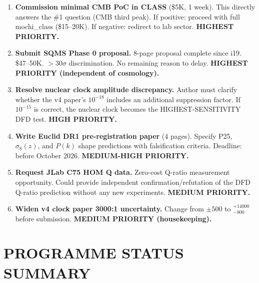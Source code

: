 \documentclass[11pt]{article}
\begin{document}
\begin{enumerate}[label=\textbf{A\arabic*.}]

\item \textbf{Commission minimal CMB PoC in CLASS} (\$5K, 1 week).
  This directly answers the \#1 question (CMB third peak).
  If positive: proceed with full mochi\_class (\$15--20K).
  If negative: redirect to lab sector.
  \textbf{HIGHEST PRIORITY.}

\item \textbf{Submit SQMS Phase 0 proposal.}
  8-page proposal complete since i19.  \$47--50K.  $>30\sigma$
  discrimination.  No remaining reason to delay.
  \textbf{HIGHEST PRIORITY (independent of cosmology).}

\item \textbf{Resolve nuclear clock amplitude discrepancy.}
  Author must clarify whether the v4 paper's $10^{-18}$ includes
  an additional suppression factor.  If $10^{-15}$ is correct,
  the nuclear clock becomes the HIGHEST-SENSITIVITY DFD test.
  \textbf{HIGH PRIORITY.}

\item \textbf{Write Euclid DR1 pre-registration paper} (4 pages).
  Specify P25, $\sigma_8(z)$, and $P(k)$ shape predictions with
  falsification criteria.  Deadline: before October 2026.
  \textbf{MEDIUM-HIGH PRIORITY.}

\item \textbf{Request JLab C75 HOM Q data.}
  Zero-cost Q-ratio measurement opportunity.  Could provide
  independent confirmation/refutation of the DFD Q-ratio prediction
  without any new experiments.
  \textbf{MEDIUM PRIORITY.}

\item \textbf{Widen v4 clock paper 3000:1 uncertainty.}
  Change from $\pm 500$ to $^{+14000}_{-800}$ before submission.
  \textbf{MEDIUM PRIORITY (housekeeping).}

\end{enumerate}


\section{PROGRAMME STATUS SUMMARY}
\end{document}
